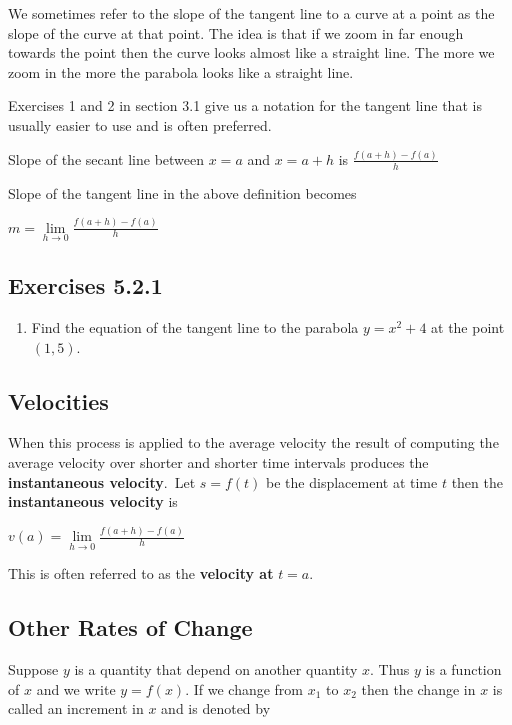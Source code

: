 We sometimes refer to the slope of the tangent line to a curve at a point as the slope
of the curve at that point. The idea is that if we zoom in far enough towards the point then the curve looks
almost like a straight line. The more we zoom in the more the parabola looks like a straight line. 

Exercises 1 and 2 in section 3.1 give us a notation for the tangent line that is usually easier to use and is often preferred. 

Slope
of the secant line between $x =a$ and $x =a +h$ is $\frac{f (a +h) -f (a)}{h}$ 

Slope of the tangent line in the above definition becomes 


\begin{center}
$m =\underset{h \rightarrow 0}{\lim }\frac{f (a +h) -f (a)}{h}$
\end{center}\par


\subsection{Exercises 5.2.1}
\begin{enumerate}
\item Find the equation of the tangent line to the parabola $y =x^{2} +4$ at the point $(1 ,5)$. \end{enumerate}


\subsection{Velocities}
When this process is applied to the average velocity the result of computing the average velocity over shorter and shorter time intervals produces
the \textbf{instantaneous velocity}.\ Let $s =f (t)$ be the displacement at time $t$ then the \textbf{instantaneous velocity} is 


\begin{center}
$v (a) =\underset{h \rightarrow 0}{\lim }\frac{f (a +h) -f (a)}{h}$
\end{center}\par
This is often referred to as the \textbf{velocity at} $t =a$. 

\subsection{Other Rates of Change}
Suppose $y$ is a quantity that depend on another quantity $x$. Thus $y$ is a function of $x$ and we write $y =f (x)$. If we change from $x_{1}$ to $x_{2}$ then the change in $x$ is called an increment in $x$ and is denoted by 



